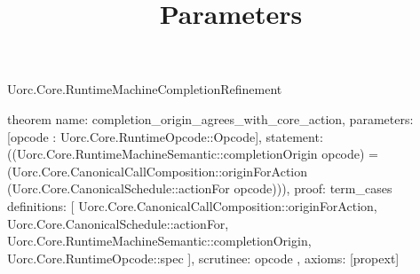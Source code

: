 \begin{lexlean}{Uorc.Core.RuntimeMachineCompletionRefinement}
\title{Parameters}
\begin{semanticmodule}
theorem{
  name: completion_origin_agrees_with_core_action,
  parameters: [opcode : Uorc.Core.RuntimeOpcode::Opcode],
  statement: ((Uorc.Core.RuntimeMachineSemantic::completionOrigin opcode) = (Uorc.Core.CanonicalCallComposition::originForAction (Uorc.Core.CanonicalSchedule::actionFor opcode))),
  proof: term_cases{
    definitions: [
      Uorc.Core.CanonicalCallComposition::originForAction,
      Uorc.Core.CanonicalSchedule::actionFor,
      Uorc.Core.RuntimeMachineSemantic::completionOrigin,
      Uorc.Core.RuntimeOpcode::spec
    ],
    scrutinee: opcode
  },
  axioms: [propext]
}
\end{semanticmodule}
\end{lexlean}
